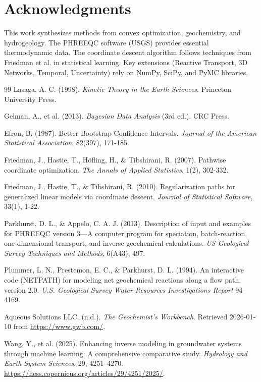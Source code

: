 \documentclass[12pt,a4paper]{article}
\theoremstyle{plain}
\theoremstyle{definition}
\theoremstyle{remark}
\begin{document}
\section*{Acknowledgments}
This work synthesizes methods from convex optimization, geochemistry, and hydrogeology. The PHREEQC software (USGS) provides essential thermodynamic data. The coordinate descent algorithm follows techniques from Friedman et al. \cite{friedman2007, friedman2010} in statistical learning. Key extensions (Reactive Transport, 3D Networks, Temporal, Uncertainty) rely on NumPy, SciPy, and PyMC libraries.

\begin{thebibliography}{99}
	Lasaga, A. C. (1998). \textit{Kinetic Theory in the Earth Sciences}. Princeton University Press.

	Gelman, A., et al. (2013). \textit{Bayesian Data Analysis} (3rd ed.). CRC Press.

	Efron, B. (1987). Better Bootstrap Confidence Intervals. \textit{Journal of the American Statistical Association}, 82(397), 171-185.

	Friedman, J., Hastie, T., Höfling, H., \& Tibshirani, R. (2007). Pathwise coordinate optimization. \textit{The Annals of Applied Statistics}, 1(2), 302-332.

	Friedman, J., Hastie, T., \& Tibshirani, R. (2010). Regularization paths for generalized linear models via coordinate descent. \textit{Journal of Statistical Software}, 33(1), 1-22.

	Parkhurst, D. L., \& Appelo, C. A. J. (2013). Description of input and examples for PHREEQC version 3---A computer program for speciation, batch-reaction, one-dimensional transport, and inverse geochemical calculations. \textit{US Geological Survey Techniques and Methods}, 6(A43), 497.

	Plummer, L. N., Prestemon, E. C., \& Parkhurst, D. L. (1994). An interactive code (NETPATH) for modeling net geochemical reactions along a flow path, version 2.0. \textit{U.S. Geological Survey Water-Resources Investigations Report} 94--4169.

	Aqueous Solutions LLC. (n.d.). \textit{The Geochemist's Workbench}. Retrieved 2026-01-10 from \url{https://www.gwb.com/}.

	Wang, Y., et al. (2025). Enhancing inverse modeling in groundwater systems through machine learning: A comprehensive comparative study. \textit{Hydrology and Earth System Sciences}, 29, 4251--4270. \url{https://hess.copernicus.org/articles/29/4251/2025/}.


\end{thebibliography}
\end{document}
